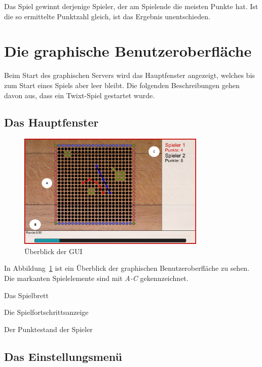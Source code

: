 \documentclass[a4paper, ngerman]{scrartcl}
\begin{document}
Das Spiel gewinnt derjenige Spieler, der am Spielende die
meisten Punkte hat. Ist die so ermittelte Punktzahl gleich, ist das Ergebnis unentschieden.

\section{Die graphische Benutzeroberfläche}

Beim Start des graphischen Servers wird das Hauptfenster angezeigt,
welches bis zum Start eines Spiels aber leer bleibt. Die folgenden
Beschreibungen gehen davon aus, dass ein Twixt-Spiel gestartet wurde.

\subsection{Das Hauptfenster}

\begin{figure}[H]
  \centering
  \includegraphics[width=0.8\textwidth]{bilder/uebersicht.png}
  \caption{Überblick der GUI}\label{fig:GUI}
\end{figure}

\begin{minipage}{\linewidth} %
In Abbildung~\ref{fig:GUI} ist ein Überblick der graphischen Benutzeroberfläche
zu sehen. Die markanten Spielelemente sind mit \emph{A-C} gekennzeichnet.

\begin{compactenum}[A)]
\item Das Spielbrett
\item Die Spielfortschrittsanzeige
\item Der Punktestand der Spieler
\end{compactenum}
\end{minipage}

\subsection{Das Einstellungsmenü}
\end{document}
